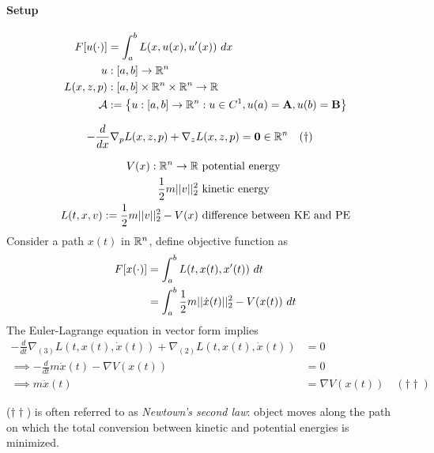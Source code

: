 \documentclass[11pt]{article}
\begin{document}
	\paragraph{Setup}
	\begin{align}
		F[u(\cdot)] &= \int_a^b L(x, u(x), u'(x))\ dx \\
		u &: [a, b] \to \mathbb{R}^n \\
		L(x, z, p) &: [a, b] \times \mathbb{R}^n \times \mathbb{R}^n \to \mathbb{R} \\
		\mathcal{A} &:= \left\{
			u: [a, b] \to \mathbb{R}^n: u \in C^1, u(a) = \textbf{A}, u(b) = \textbf{B}
		\right\} 
	\end{align}

	\begin{theorem}
		\begin{align}
			- \frac{d}{dx} \nabla_p L(x, z, p) + \nabla_z L(x, z, p) &= \textbf{0} \in \mathbb{R}^n \quad (\dagger)
		\end{align} 
	\end{theorem}
	
	\begin{example}
		\begin{align}
			V(x): \mathbb{R}^n \to \mathbb{R} &\text{ potential energy} \\
			\frac{1}{2} m \vert \vert {v} \vert \vert_2^2 &\text{ kinetic energy} \\
			L(t, x, v):= \frac{1}{2} m \vert \vert {v} \vert \vert_2^2 - V(x) &\text{ difference between KE and PE}
		\end{align}
		Consider a path $x(t)$ in $\mathbb{R}^n$, define objective function as
		\begin{align}
			F[x(\cdot)] &= \int_a^b L(t, x(t), x'(t))\ dt \\
			&= \int_a^b \frac{1}{2} m \vert \vert {\dot{x}(t)} \vert \vert_2^2 - V(x(t))\ dt
		\end{align}
		The Euler-Lagrange equation in vector form implies
		\begin{align}
			- \frac{d}{dt} \nabla_{(3)} L(t, x(t), \dot{x}(t))
			+ \nabla_{(2)} L(t, x(t), \dot{x}(t)) &= 0 \\
			\implies - \frac{d}{dt} m \dot{x}(t) - \nabla V(x(t)) &= 0 \\
			\implies m \ddot{x}(t) &= \nabla V(x(t))\quad (\dagger \dagger)
		\end{align}
	\end{example}
	
	\begin{remark}
		($\dagger \dagger$) is often referred to as \emph{Newtown's second law}: object moves along the path on which the total conversion between kinetic and potential energies is minimized.
	\end{remark}
	
\end{document}
